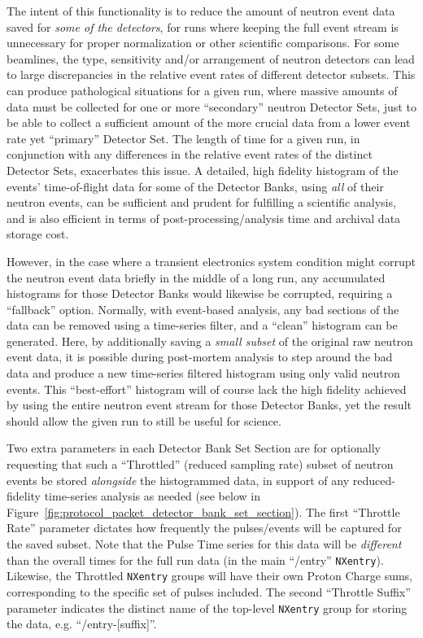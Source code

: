 The intent of this functionality is to reduce the amount
of neutron event data saved for {\it some of the detectors},
for runs where keeping the full event stream is unnecessary
for proper normalization or other scientific comparisons.
For some beamlines,
the type, sensitivity and/or arrangement of neutron detectors can lead
to large discrepancies in the relative event rates
of different detector subsets.
This can produce pathological situations for a given run,
where massive amounts of data must be collected
for one or more ``secondary'' neutron Detector Sets,
just to be able to collect a sufficient amount of the more crucial data
from a lower event rate yet ``primary'' Detector Set.
The length of time for a given run,
in conjunction with any differences in the relative event rates
of the distinct Detector Sets,
exacerbates this issue.
A detailed, high fidelity histogram of the events' time-of-flight data
for some of the Detector Banks,
using {\it all} of their neutron events,
can be sufficient and prudent for fulfilling a scientific analysis,
and is also efficient in terms of post-processing/analysis time
and archival data storage cost.

However, in the case where a transient electronics system condition
might corrupt the neutron event data briefly in the middle of a long run,
any accumulated histograms for those Detector Banks would
likewise be corrupted, requiring a ``fallback'' option.
Normally, with event-based analysis, any bad sections of the data
can be removed using a time-series filter,
and a ``clean'' histogram can be generated.
Here, by additionally saving a {\it small subset} of the
original raw neutron event data,
it is possible during post-mortem analysis to step around the bad data
and produce a new time-series filtered histogram
using only valid neutron events.
This ``best-effort'' histogram will of course lack the high fidelity
achieved by using the entire neutron event stream for those Detector Banks,
yet the result should allow the given run to still be useful for science.

Two extra parameters in each Detector Bank Set Section are for
optionally requesting that such a ``Throttled'' (reduced sampling rate)
subset of neutron events be stored {\it alongside} the histogrammed data,
in support of any reduced-fidelity time-series analysis as needed
(see below in Figure~\ref{fig:protocol_packet_detector_bank_set_section}).
The first ``Throttle Rate'' parameter dictates how frequently
the pulses/events will be captured for the saved subset.
Note that the Pulse Time series for this data will be {\it different}
than the overall times for the full run data
(in the main ``/entry'' {\tt NXentry}).
Likewise, the Throttled {\tt NXentry} groups will have their
own Proton Charge sums,
corresponding to the specific set of pulses included.
The second ``Throttle Suffix'' parameter indicates the distinct name
of the top-level {\tt NXentry} group for storing the data,
e.g. ``/entry-[suffix]''.

